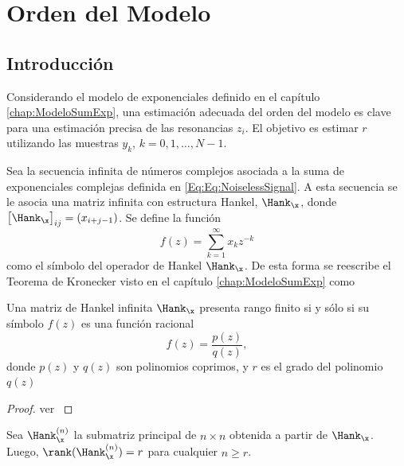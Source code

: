 \chapter{Orden del Modelo}\label{chap:OrdenModelo}


	\section{Introducción}
 	Considerando el modelo de exponenciales definido en el capítulo \ref{chap:ModeloSumExp}, una estimación adecuada del orden del modelo es clave para una estimación precisa de las resonancias $z_i$. El objetivo es estimar $r$ utilizando las muestras $y_k$, $k = 0,1,\ldots,N-1$.

	Sea la secuencia infinita de números complejos asociada a la suma de exponenciales complejas definida en \eqref{Eq:Eq:NoiselessSignal}. A esta secuencia se le asocia una matriz infinita con estructura Hankel, $\Hank_{\x}$, donde $\big[\Hank_{\x}\big]_{ij} = (x_{i+j-1})$. Se define la función
	\begin{equation}
		f(z) = \sum_{k=1}^\infty x_k z^{-k}
		\label{Eq:SymbolHankel}
	\end{equation}
	como el símbolo del operador de Hankel $\Hank_{\x}$. De esta forma se reescribe el Teorema de Kronecker visto en el capítulo \eqref{chap:ModeloSumExp} como

	\begin{theorem}\label{Th:Kronecker2}
		Una matriz de Hankel infinita $\Hank_{\x}$ presenta rango finito si y sólo si su símbolo $f(z)$ es una función racional
		\begin{equation}
			f(z) = \frac{p(z)}{q(z)},
			\label{Eq:RationalFunction}
		\end{equation}
		donde $p(z)$ y $q(z)$ son polinomios coprimos, y $r$ es el grado del polinomio $q(z)$
	\end{theorem}
	\begin{proof}
		ver \cite{Fuhrmann2011}
	\end{proof}
	Sea $\Hank_{\x}^{(n)}$ la submatriz principal de $n\times n$ obtenida a partir de $\Hank_{\x}$. Luego, $\rank(\Hank_{\x}^{(n)}) = r$ para cualquier $n\geq r$.

